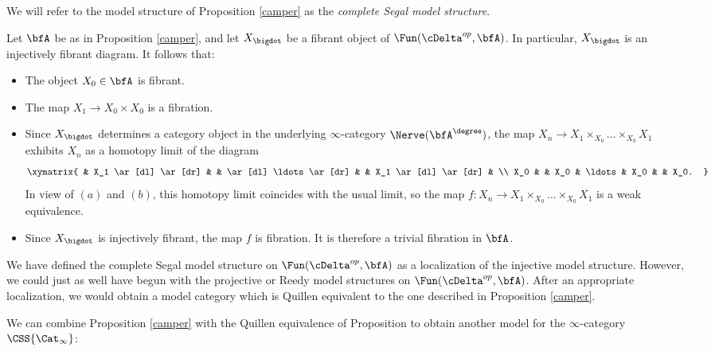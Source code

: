 We will refer to the model structure of Proposition \ref{camper} as the {\it complete Segal model structure}. 

\begin{remark}\label{sweetuma}
Let $\bfA$ be as in Proposition \ref{camper}, and let $X_{\bigdot}$ be a fibrant object of
$\Fun( \cDelta^{op}, \bfA)$. In particular, $X_{\bigdot}$ is an injectively fibrant diagram. It follows that:
\begin{itemize}
\item[$(a)$] The object $X_0 \in \bfA$ is fibrant.
\item[$(b)$] The map $X_1 \rightarrow X_0 \times X_0$ is a fibration.
\item[$(c)$] Since $X_{\bigdot}$ determines a category object in the underlying $\infty$-category
$\Nerve(\bfA^{\degree})$, the map $X_{n} \rightarrow X_1 \times_{X_0} \ldots \times_{X_0} X_1$
exhibits $X_{n}$ as a homotopy limit of the diagram
$$ \xymatrix{ & X_1 \ar[dl] \ar[dr] & & \ar[dl] \ldots \ar[dr]  & & X_1 \ar[dl] \ar[dr] & \\
X_0 & & X_0 & \ldots & X_0 & & X_0. }$$
In view of $(a)$ and $(b)$, this homotopy limit coincides with the usual limit, so the map
$f: X_{n} \rightarrow X_1 \times_{X_0} \ldots \times_{X_0} X_1$ is a weak equivalence.
\item[$(d)$] Since $X_{\bigdot}$ is injectively fibrant, the map $f$ is fibration. It is therefore
a trivial fibration in $\bfA$.
\end{itemize}
\end{remark}

\begin{remark}
We have defined the complete Segal model structure on $\Fun( \cDelta^{op}, \bfA)$ as a localization of the injective model structure. However, we could just as well have begun with the projective or Reedy model structures on $\Fun( \cDelta^{op}, \bfA)$. After an appropriate localization, we would obtain a model category which is Quillen equivalent to the one described in Proposition \ref{camper}.
\end{remark}

We can combine Proposition \ref{camper} with the Quillen equivalence of
Proposition  to obtain another model for the $\infty$-category
$\CSS{ \Cat_{\infty}}$:

